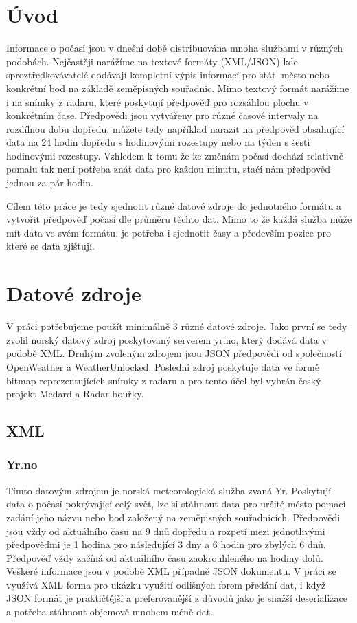 \documentclass[czech,bachelor,dept460,male,csharp,cpdeclaration]{diploma}
\begin{document}
	
	\MakeTitlePages
	
	\section{Úvod}	
	
	Informace o počasí jsou v dnešní době distribuována mnoha službami v různých podobách. Nejčastěji narážíme na textové formáty (XML/JSON) kde sproztředkovávatelé dodávají kompletní výpis informací pro stát, město nebo konkrétní bod na základě zeměpisných souřadnic. Mimo textový formát narážíme i na snímky z radaru, které poskytují předpověď pro rozsáhlou plochu v konkrétním čase. Předpovědi jsou vytvářeny pro různé časové intervaly na rozdílnou dobu dopředu, můžete tedy například narazit na předpověď obsahující data na 24 hodin dopředu s hodinovými rozestupy nebo na týden s šesti hodinovými rozestupy. Vzhledem k tomu že ke změnám počasí dochází relativně pomalu tak není potřeba znát data pro každou minutu, stačí nám předpověď jednou za pár hodin.
	
	Cílem této práce je tedy sjednotit různé datové zdroje do jednotného formátu a vytvořit předpověď počasí dle průměru těchto dat. Mimo to že každá služba může mít data ve svém formátu, je potřeba i sjednotit časy a především pozice pro které se data zjišťují. 
	
	\section{Datové zdroje}
	
	V práci potřebujeme použít minimálně 3 různé datové zdroje. Jako první se tedy zvolil norský datový zdroj poskytovaný serverem yr.no, který dodává data v podobě XML. Druhým zvoleným zdrojem jsou JSON předpovědi od společností OpenWeather a WeatherUnlocked. Poslední zdroj poskytuje data ve formě bitmap reprezentujících snímky z radaru a pro tento účel byl vybrán český projekt Medard a Radar bouřky.
	
	\subsection{XML}
	\subsubsection{Yr.no}
	
	Tímto datovým zdrojem je norská meteorologická služba zvaná Yr. Poskytují data o počasí pokrývající celý svět, lze si stáhnout data pro určité město pomací zadání jeho názvu nebo bod založený na zeměpisných souřadnicích. Předpovědi jsou vždy od aktuálního času na 9 dnů dopředu a rozpetí mezi jednotlivými předpověďmi je 1 hodina pro následující 3 dny a 6 hodin pro zbylých 6 dnů. Předpověď vždy začíná od aktuálního času zaokrouhleného na hodiny dolů. Veškeré informace jsou v podobě XML případně JSON dokumentu. V práci se využívá XML forma pro ukázku využití odlišných forem předání dat, i když JSON formát je praktičtější a preferovanější z důvodů jako je snažší deserializace a potřeba stáhnout objemově mnohem méně dat.
	
\end{document}
